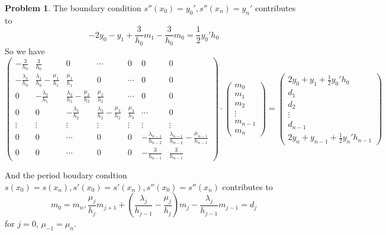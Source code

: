 \documentclass[a4paper]{article}
\theoremstyle{definition}
\newtheorem{problem}{Problem}
\theoremstyle{plain}
\newcommand{\<}{\left<}
\renewcommand{\>}{\right>}
\numberwithin{equation}{problem}
\begin{document}
\begin{problem}
     The boundary condition  $ s''(x_0)=y_0',s''(x_n)=y_n' $ contributes to 
     \[-2y_0-y_1+\frac{3}{h_0}m_1-\frac{3}{h_0}m_0=\frac{1}{2}y_0'h_0\]
     So we have 
     \[
        \begin{pmatrix}
            -\frac{3}{h_0}&\frac{3}{h_0}&0&\cdots&0&0&0\\
            -\frac{\lambda_1}{h_0}&\frac{\lambda_1}{h_0}-\frac{\mu_1}{h_1}&\frac{\mu_1}{h_1}&0&\cdots&0&0\\
            0&-\frac{\lambda_2}{h_1}&\frac{\lambda_2}{h_1}-\frac{\mu_2}{h_2}&\frac{\mu_2}{h_2}&\cdots&0&0\\
            0&0&-\frac{\lambda_3}{h_2}&\frac{\lambda_3}{h_2}-\frac{\mu_3}{h_2}&\frac{\mu_3}{h_3}&\cdots&0\\
            \vdots&\vdots&\vdots&\vdots&\vdots&\vdots&\vdots\\
            0&0&\cdots&0&0&-\frac{\lambda_{n-1}}{h_{n-2}}&\frac{\lambda_{n-1}}{h_{n-2}}-\frac{\mu_{n-1}}{h_{n-1}}\\
            0&0&\cdots&0&0&-\frac{3}{h_{n-1}}&\frac{3}{h_{n-1}}
         \end{pmatrix}\cdot\begin{pmatrix}
            m_0\\
            m_1\\
            m_2\\
            \vdots\\
            m_{n-1}\\
            m_n
         \end{pmatrix}=\begin{pmatrix}
            2y_0+y_1+\frac{1}{2}y_0'h_0\\
            d_1\\
            d_2\\
            \vdots\\
            d_{n-1}\\
            2y_n+y_{n-1}+\frac{1}{2}y_n'h_{n-1}
         \end{pmatrix}
     \] 

     And the period boudary condtion  $ s(x_0)=s(x_n),s'(x_0)=s'(x_n),s''(x_0)=s''(x_n) $ contributes to
     \[m_0=m_n,\frac{\mu_j}{h_j}m_{j+1}+(\frac{\lambda_j}{h_{j-1}}-\frac{\mu_j}{h_j})m_j-\frac{\lambda_j}{h_{j-1}}m_{j-1}=d_j\] 
     for  $ j=0 $,  $ \mu_{-1}=\mu_n $.
     

\end{problem}
\end{document}
